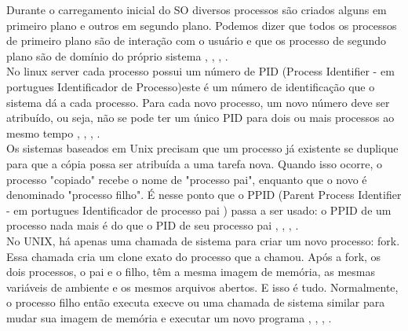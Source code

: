 Durante o carregamento inicial do SO diversos processos são criados alguns em primeiro plano e outros em segundo plano. Podemos dizer que todos os processos de primeiro plano são de interação com o usuário e que os processo de segundo plano são de domínio do próprio sistema \cite{Tanenbaum2016}, \cite{info2020}, \cite{Morimoto2011}, \cite{Man2020}.\\
No linux server cada processo possui um número de PID (Process Identifier - em portugues Identificador de Processo)este é um número de identificação que o sistema dá a cada processo. Para cada novo processo, um novo número deve ser atribuído, ou seja, não se pode ter um único PID para dois ou mais processos ao mesmo tempo \cite{Tanenbaum2016}, \cite{info2020}, \cite{Morimoto2011}, \cite{Man2020}.\\
Os sistemas baseados em Unix precisam que um processo já existente se duplique para que a cópia possa ser atribuída a uma tarefa nova. Quando isso ocorre, o processo "copiado" recebe o nome de "processo pai", enquanto que o novo é denominado "processo filho". É nesse ponto que o PPID (Parent Process Identifier - em portugues Identificador de processo pai ) passa a ser usado: o PPID de um processo nada mais é do que o PID de seu processo pai \cite{Tanenbaum2016}, \cite{info2020}, \cite{Morimoto2011}, \cite{Man2020}.\\
No UNIX, há apenas uma chamada de sistema para criar um novo processo: fork. Essa chamada cria um clone exato do processo que a chamou. Após a fork, os dois processos, o pai e o filho, têm a mesma imagem de memória, as mesmas variáveis de ambiente e os mesmos arquivos abertos. E isso é tudo. Normalmente, o processo filho então executa execve ou uma chamada de sistema similar para mudar sua imagem de memória e executar um novo programa  \cite{Tanenbaum2016}, \cite{info2020}, \cite{Morimoto2011}, \cite{Man2020}.